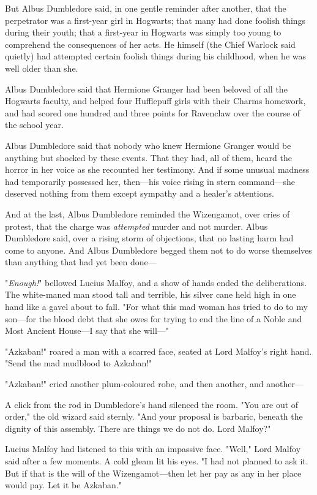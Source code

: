 But Albus Dumbledore said, in one gentle reminder after another, that the
perpetrator was a first-year girl in Hogwarts; that many had done foolish
things during their youth; that a first-year in Hogwarts was simply too young
to comprehend the consequences of her acts. He himself (the Chief Warlock said
quietly) had attempted certain foolish things during his childhood, when he was
well older than she.

Albus Dumbledore said that Hermione Granger had been beloved of all the
Hogwarts faculty, and helped four Hufflepuff girls with their Charms homework,
and had scored one hundred and three points for Ravenclaw over the course of
the school year.

Albus Dumbledore said that nobody who knew Hermione Granger would be anything
but shocked by these events. That they had, all of them, heard the horror in
her voice as she recounted her testimony. And if some unusual madness had
temporarily possessed her, then—his voice rising in stern command—she
deserved nothing from them except sympathy and a healer’s attentions.

And at the last, Albus Dumbledore reminded the Wizengamot, over cries of
protest, that the charge was \emph{attempted} murder and not murder. Albus
Dumbledore said, over a rising storm of objections, that no lasting harm had
come to anyone. And Albus Dumbledore begged them not to do worse themselves
than anything that had yet been done—

"\emph{Enough!}" bellowed Lucius Malfoy, and a show of hands ended the
deliberations. The white-maned man stood tall and terrible, his silver cane
held high in one hand like a gavel about to fall. "For what this mad woman has
tried to do to my son—for the blood debt that she owes for trying to end the
line of a Noble and Most Ancient House—I say that she will—"

"Azkaban!" roared a man with a scarred face, seated at Lord Malfoy’s right
hand. "Send the mad mudblood to Azkaban!"

"Azkaban!" cried another plum-coloured robe, and then another, and another—

A click from the rod in Dumbledore’s hand silenced the room. "You are out of
order," the old wizard said sternly. "And your proposal is barbaric, beneath
the dignity of this assembly. There are things we do not do. Lord Malfoy?"

Lucius Malfoy had listened to this with an impassive face. "Well," Lord Malfoy
said after a few moments. A cold gleam lit his eyes. "I had not planned to ask
it. But if that is the will of the Wizengamot—then let her pay as any in her
place would pay. Let it be Azkaban."

